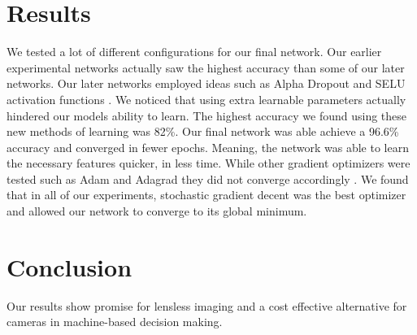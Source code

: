 \documentclass[11pt,conference]{ieeeconf}
\begin{document}
\section{Results}
We tested a lot of different configurations for our final network. Our earlier experimental networks actually saw the highest accuracy than some of our later networks. Our later networks employed ideas such as Alpha Dropout and SELU activation functions \cite{DBLP:journals/corr/KlambauerUMH17}. We noticed that using extra learnable parameters actually hindered our models ability to learn. The highest accuracy we found using these new methods of learning was 82\%. 
%
Our final network was able achieve a 96.6\% accuracy and converged in fewer epochs. Meaning, the network was able to learn the necessary features quicker, in less time. While other gradient optimizers were tested such as Adam and Adagrad they did not converge accordingly \cite{DBLP:journals/corr/KingmaB14, Duchi:EECS-2010-24}. We found that in all of our experiments, stochastic gradient decent was the best optimizer and allowed our network to converge to its global minimum.
%
%
\section{Conclusion}
Our results show promise for lensless imaging and a cost effective alternative for cameras in machine-based decision making.
%

\end{document}

